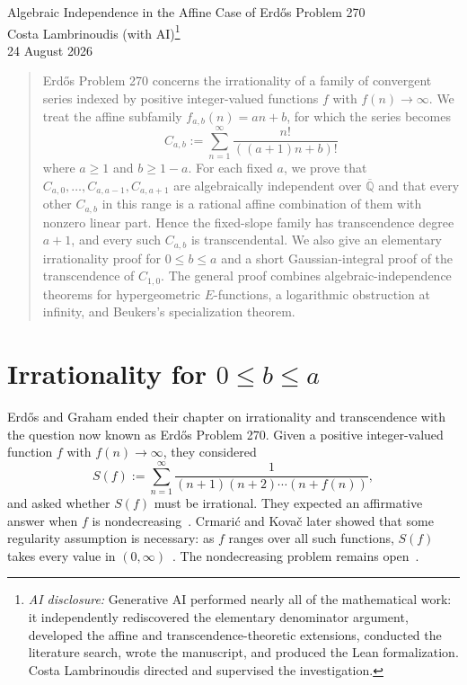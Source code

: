 \documentclass[12pt]{article}
\begin{document}
\begin{center}
{\LARGE Algebraic Independence in the Affine Case of Erd\H{o}s Problem 270}\\[1.5ex]
{\large Costa Lambrinoudis {\normalsize(with AI)}}\footnote{\textit{AI disclosure:} Generative AI performed nearly all of the mathematical work: it independently rediscovered the elementary denominator argument, developed the affine and transcendence-theoretic extensions, conducted the literature search, wrote the manuscript, and produced the Lean formalization. Costa Lambrinoudis directed and supervised the investigation.}\\[0.5ex]
{24 August 2026}
\end{center}

\begin{quote}
\small
Erd\H{o}s Problem 270 concerns the irrationality of a family of convergent series indexed by positive integer-valued functions $f$ with $f(n)\to\infty$. We treat the affine subfamily $f_{a,b}(n)=an+b$, for which the series becomes
\[
C_{a,b}:=\sum_{n=1}^{\infty}\frac{n!}{((a+1)n+b)!}
\]
where $a\geq1$ and $b\geq1-a$. For each fixed $a$, we prove that $C_{a,0},\ldots,C_{a,a-1},C_{a,a+1}$ are algebraically independent over $\overline{\mathbb Q}$ and that every other $C_{a,b}$ in this range is a rational affine combination of them with nonzero linear part. Hence the fixed-slope family has transcendence degree $a+1$, and every such $C_{a,b}$ is transcendental. We also give an elementary irrationality proof for $0\leq b\leq a$ and a short Gaussian-integral proof of the transcendence of $C_{1,0}$. The general proof combines algebraic-independence theorems for hypergeometric $E$-functions, a logarithmic obstruction at infinity, and Beukers's specialization theorem.
\end{quote}

\section{Irrationality for \texorpdfstring{$0\leq b\leq a$}{0 <= b <= a}}
\label{sec:irrationality}

Erd\H{o}s and Graham ended their chapter on irrationality and transcendence with the question now known as Erd\H{o}s Problem 270. Given a positive integer-valued function $f$ with $f(n)\to\infty$, they considered
\[
S(f):=\sum_{n=1}^{\infty}
\frac1{(n+1)(n+2)\cdots(n+f(n))},
\]
and asked whether $S(f)$ must be irrational. They expected an affirmative answer when $f$ is nondecreasing~\cite[p.~66]{erdos-graham}. Crmari\'c and Kova\v{c} later showed that some regularity assumption is necessary: as $f$ ranges over all such functions, $S(f)$ takes every value in $(0,\infty)$~\cite[Theorem~1]{crmaric-kovac}. The nondecreasing problem remains open~\cite{bloom-270}.
\end{document}

